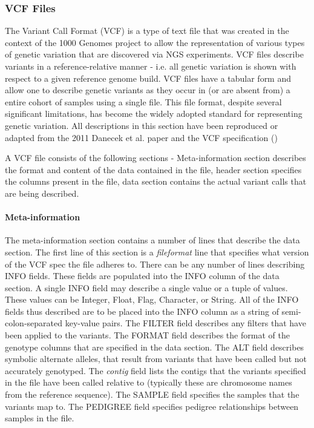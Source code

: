 \subsubsection{VCF Files}
The Variant Call Format (VCF)\autocite{danecek2011variant} is a type of text file that was created in the context of the 1000 Genomes project to allow the representation of various types of genetic variation that are discovered via NGS experiments. VCF files describe variants in a reference-relative manner - i.e. all genetic variation is shown with respect to a given reference genome build. VCF files have a tabular form and allow one to describe genetic variants as they occur in (or are absent from) a entire cohort of samples using a single file. This file format, despite several significant limitations, has become the widely adopted standard for representing genetic variation. All descriptions in this section have been reproduced or adapted from the 2011 Danecek et al. paper and the VCF specification ()   

A VCF file consists of the following sections - Meta-information section describes the format and content of the data contained in the file, header section specifies the columns present in the file, data section contains the actual variant calls that are being described.

\paragraph{Meta-information}
The meta-information section contains a number of lines that describe the data section. The first line of this section is a \emph{fileformat} line that specifies what version of the VCF spec the file adheres to. There can be any number of lines describing INFO fields. These fields are populated into the INFO column of the data section. A single INFO field may describe a single value or a tuple of values. These values can be Integer, Float, Flag, Character, or String. All of the INFO fields thus described are to be placed into the INFO column as a string of semi-colon-separated key-value pairs. The FILTER field describes any filters that have been applied to the variants. The FORMAT field describes the format of the genotype columns that are specified in the data section. The ALT field describes symbolic alternate alleles, that result from variants that have been called but not accurately genotyped. The \emph{contig} field lists the contigs that the variants specified in the file have been called relative to (typically these are chromosome names from the reference sequence). The SAMPLE field specifies the samples that the variants map to. The PEDIGREE field specifies pedigree relationships between samples in the file.

